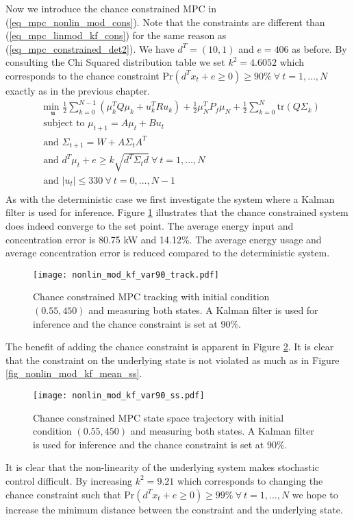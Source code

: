 Now we introduce the chance constrained MPC in (\ref{eq_mpc_nonlin_mod_cons}). Note that the constraints are different than (\ref{eq_mpc_linmod_kf_cons}) for the same reason as (\ref{eq_mpc_constrained_det2}). We have $d^T = (10, 1)$ and $e=406$ as before. By consulting the Chi Squared distribution table we set $k^2 = 4.6052$ which corresponds to the chance constraint $\text{Pr}(d^Tx_t + e \geq 0) \geq 90\% ~\forall ~t=1,...,N$ exactly as in the previous chapter.
\begin{equation}
\begin{aligned}
&\underset{\mathbf{u}}{\text{min }} \frac{1}{2}\sum_{k=0}^{N-1} \left( \mu_k^TQ\mu_k + u_k^TRu_k \right) + \frac{1}{2}\mu_N^TP_f\mu_N + \frac{1}{2}\sum_{k=0}^N \text{tr}(Q\Sigma_k) \\
& \text{subject to } \mu_{t+1}=A\mu_t + Bu_t \\
& \text{and } \Sigma_{t+1} = W+A\Sigma_t A^T \\
& \text{and } d^T\mu_t + e \geq k\sqrt{d^T \Sigma_t d} ~\forall ~t=1,...,N\\
& \text{and } |u_t| \leq 330 ~\forall ~t=0,...,N-1\\
\end{aligned}
\label{eq_mpc_nonlin_mod_cons}
\end{equation}
As with the deterministic case we first investigate the system where a Kalman filter is used for inference. Figure \ref{fig_nonlin_mod_kf_var90_track} illustrates that the chance constrained system does indeed converge to the set point. The average energy input and concentration error is 80.75 kW and 14.12\%. The average energy usage and average concentration error is reduced compared to the deterministic system. 
\begin{figure}[H] 
\centering
\texttt{[image: nonlin\_mod\_kf\_var90\_track.pdf]}
\caption{Chance constrained MPC tracking with initial condition $(0.55, 450)$ and measuring both states. A Kalman filter is used for inference and the chance constraint is set at 90\%.}
\label{fig_nonlin_mod_kf_var90_track}
\end{figure}
The benefit of adding the chance constraint is apparent in Figure \ref{fig_nonlin_mod_kf_var90_ss}. It is clear that the constraint on the underlying state is not violated as much as in Figure \ref{fig_nonlin_mod_kf_mean_ss}. 
\begin{figure}[H] 
\centering
\texttt{[image: nonlin\_mod\_kf\_var90\_ss.pdf]}
\caption{Chance constrained MPC state space trajectory with initial condition $(0.55, 450)$ and measuring both states. A Kalman filter is used for inference and the chance constraint is set at 90\%.}
\label{fig_nonlin_mod_kf_var90_ss}
\end{figure}
It is clear that the non-linearity of the underlying system makes stochastic control difficult. By increasing $k^2=9.21$ which corresponds to changing the chance constraint such that $\text{Pr}(d^Tx_t + e \geq 0) \geq 99\% ~\forall ~t=1,...,N$ we hope to increase the minimum distance between the constraint and the underlying state.

